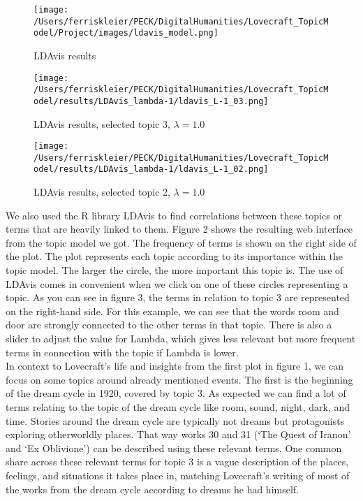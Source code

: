 \begin{figure}[ht]
    \centering
    \texttt{[image: /Users/ferriskleier/PECK/DigitalHumanities/Lovecraft\_TopicModel/Project/images/ldavis\_model.png]}
    \caption{LDAvis results}
    \label{fig:mesh2}
\end{figure}

\begin{figure}[p]
    \centering
    \texttt{[image: /Users/ferriskleier/PECK/DigitalHumanities/Lovecraft\_TopicModel/results/LDAvis\_lambda-1/ldavis\_L-1\_03.png]}
    \caption{LDAvis results, selected topic 3, $\lambda=1.0$}
    \label{fig:mesh3}
\end{figure}

\begin{figure}[p]
    \centering
    \texttt{[image: /Users/ferriskleier/PECK/DigitalHumanities/Lovecraft\_TopicModel/results/LDAvis\_lambda-1/ldavis\_L-1\_02.png]}
    \caption{LDAvis results, selected topic 2, $\lambda=1.0$}
    \label{fig:mesh4}
\end{figure}

We also used the R library LDAvis to find correlations between these topics or terms that are heavily 
linked to them. Figure 2 shows the resulting web interface from the topic model we got. The frequency 
of terms is shown on the right side of the plot. The plot represents each topic according to its 
importance within the topic model. The larger the circle, the more important this topic is. The use of 
LDAvis comes in convenient when we click on one of these circles representing a topic. As you can see 
in figure 3, the terms in relation to topic 3 are represented on the right-hand side. For this example, 
we can see that the words room and door are strongly connected to the other terms in that topic. There 
is also a slider to adjust the value for Lambda, which gives less relevant but more frequent terms in 
connection with the topic if Lambda is lower.\\

In context to Lovecraft’s life and insights from the first plot in figure 1, we can focus on some 
topics around already mentioned events. The first is the beginning of the dream cycle in 1920, covered 
by topic 3. As expected we can find a lot of terms relating to the topic of the dream cycle like room, 
sound, night, dark, and time. Stories around the dream cycle are typically not dreams but protagonists 
exploring otherworldly places. That way works 30 and 31 (‘The Quest of Iranon’ and ‘Ex Oblivione’) can 
be described using these relevant terms. One common share across these relevant terms for topic 3 is a 
vague description of the places, feelings, and situations it takes place in, matching Lovecraft’s 
writing of most of the works from the dream cycle according to dreams he had himself.\\



